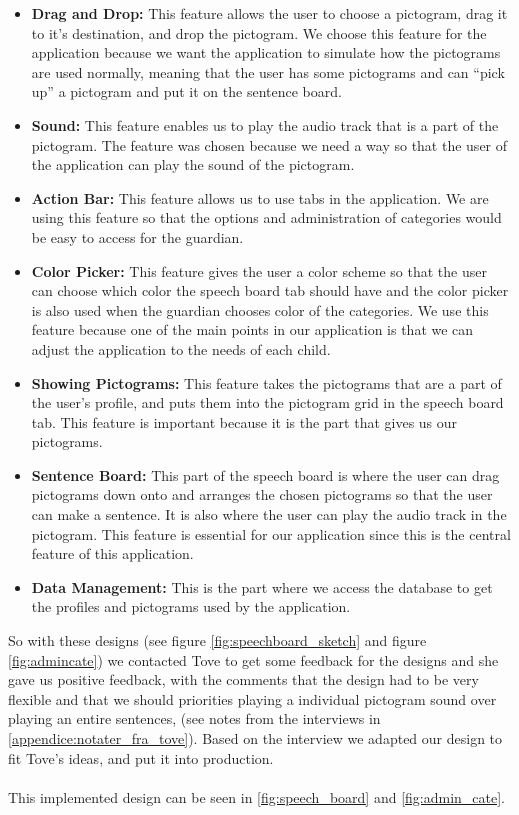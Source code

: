 \begin{itemize}
	\item \textbf{Drag and Drop:} This feature allows the user to choose a pictogram, drag it to it's destination, and drop the pictogram.  We choose this feature for the application because we want the application to simulate how the pictograms are used normally, meaning that the user has some pictograms and can ``pick up'' a pictogram and put it on the sentence board.  
	\item \textbf{Sound:} This feature enables us to play the audio track that is a part of the pictogram. The feature was chosen because we need a way so that the user of the application can play the sound of the pictogram. 
	\item \textbf{Action Bar:} This feature allows us to use tabs in the application. We are using this feature so that the options and administration of categories would be easy to access for the guardian. 
	\item \textbf{Color Picker:} This feature gives the user a color scheme so that the user can choose which color the speech board tab should have and the color picker is also used when the guardian chooses color of the categories. We use this feature because one of the main points in our application is that we can adjust the application to the needs of each child. 
	\item \textbf{Showing Pictograms:} This feature takes the pictograms that are a part of the user's profile, and puts them into the pictogram grid in the speech board tab. This feature is important because it is the part that gives us our pictograms. 
	\item \textbf{Sentence Board:} This part of the speech board is where the user can drag pictograms down onto and arranges the chosen pictograms so that the user can make a sentence. It is also where the user can play the audio track in the pictogram. This feature is essential for our application since this is the central feature of this application. 
	\item \textbf{Data Management:} This is the part where we access the database to get the profiles and pictograms used by the application.
\end{itemize}

So with these designs (see figure \ref{fig:speechboard_sketch} and figure \ref{fig:admincate}) we contacted Tove to get some feedback for the designs and she gave us positive  feedback, with the comments that the design had to be very flexible and that we should priorities playing a individual pictogram sound over playing an entire sentences, (see notes from the interviews in \autoref{appendice:notater_fra_tove}). Based on the interview we adapted our design to fit Tove's ideas, and put it into production.\\  
\\
This implemented design can be seen in \autoref{fig:speech_board} and \autoref{fig:admin_cate}.

